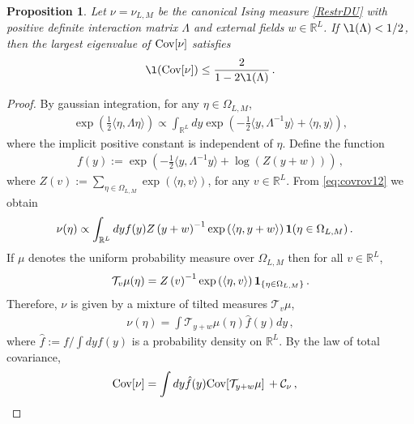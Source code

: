 \documentclass[11pt,reqno]{amsart}
\numberwithin{equation}{section}
\numberwithin{figure}{section}
\newtheorem{proposition}[theorem]{Proposition}
\renewcommand{\leq}{\le}%
\newcommand{\cov}{{\rm Cov}}
\newcommand{\1}{\mathds{1}}
\newcommand{\scalar}[2]{\langle #1 , #2\rangle}
\let\O=\Omega
\let\L=\Lambda
\newcommand{\cC}{\ensuremath{\mathcal C}}
\newcommand{\bbR}{{\ensuremath{\mathbb R}} }
\begin{document}
\begin{proposition}\label{prop_cov}
Let $\nu =\nu_{L,M}$ be the canonical Ising measure \eqref{RestrDU} with positive definite interaction matrix $\L$
and external fields $w\in\bbR^L$. If $\l(\L)<1/2$, then the largest eigenvalue of $\cov[\nu]$ satisfies
\begin{align}
	\l(\cov[\nu]) \leq  \frac{2}{1-2\l(\L)}\,.	\end{align}	
\end{proposition}
\begin{proof}
By gaussian integration, for any $\eta\in\O_{L,M}$, 
	\begin{align}\label{eq:covrov12}
		\exp(\tfrac12\scalar{\eta}{\L\eta})  \propto %
		 \int_{\bbR^{L}}dy\exp\left(-\tfrac12\scalar{y}{\L^{-1}y} +\scalar{\eta}{y} \right),
	\end{align}
where the implicit positive constant is independent of $\eta$. Define the function
\begin{align*}
		f(y) := \exp\left(-\tfrac12\scalar{y}{\L^{-1}y} + \log\left(Z\left(y + w\right)\right)\right)\,, %
	\end{align*}
where $Z\left(v\right):=\sum_{\eta \in \O_{L,M}}\exp\left(\scalar{\eta}{v}\right)$, for any $v\in\bbR^{L}$.
From \eqref{eq:covrov12} we obtain 
\begin{align*}
		\nu(\eta) &\propto \int_{\bbR^{L}}dyf(y)Z\left(y + w\right)^{-1}
\exp\left( \scalar{\eta}{y + w} \right){\bf 1}(\eta \in \O_{L,M})\,.
	\end{align*}
		If $\mu$ denotes the uniform probability measure over $\O_{L,M}$ then for all $v\in\bbR^L$, \[
		\mathcal{T}_{v}\mu(\eta)=Z\left( v\right)^{-1}\exp\left( \scalar{\eta}{v} \right){\bf 1}_{\{\eta \in \O_{L,M}\}}\,.\] 
		Therefore, $\nu$ is given by a mixture of tilted measures $\mathcal{T}_{v}\mu$, 
\begin{align}\label{eq:decrho}
\nu(\eta) = \int \mathcal{T}_{y + w}\mu(\eta)\hat f(y)dy\,,\end{align}
where $\hat f:=f/\int dyf(y)$ is a probability density on $\bbR^{L}$.
By the law of total covariance,
	\begin{align}\label{eq:covtot}
		\cov[\nu] &= \int   dy\hat f(y) \cov [\mathcal{T}_{y + w}\mu]
		 \,+\cC_\nu\,,%
	\end{align}

\end{proof}
\end{document}
